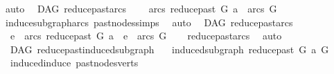\begin{isabellebody}
\ auto\isanewline
{}\isamarkupfalse%
%
\endisatagproof
{\isafoldproof}%
%
\isadelimproof
%
\endisadelimproof
%
\isadelimdocument
%
\endisadelimdocument
%
\isatagdocument
%
\isamarkuptrue%
%
\endisatagdocument
{\isafolddocument}%
%
\isadelimdocument
%
\endisadelimdocument
{}\isamarkupfalse%
\ {\isacharparenleft}{\kern0pt}\ DAG{\isacharparenright}{\kern0pt}\ reduce{\isacharunderscore}{\kern0pt}past{\isacharunderscore}{\kern0pt}arcs{\isacharcolon}{\kern0pt}\ \isanewline
\ \ \ {\isachardoublequoteopen}arcs\ {\isacharparenleft}{\kern0pt}reduce{\isacharunderscore}{\kern0pt}past\ G\ a{\isacharparenright}{\kern0pt}\ {\isasymsubseteq}\ arcs\ G{\isachardoublequoteclose}\isanewline
%
\isadelimproof
\ \ %
\endisadelimproof
%
\isatagproof
{}\isamarkupfalse%
\ induce{\isacharunderscore}{\kern0pt}subgraph{\isacharunderscore}{\kern0pt}arcs\ past{\isacharunderscore}{\kern0pt}nodes{\isachardot}{\kern0pt}simps\ \isamarkupfalse%
\ auto%
\endisatagproof
{\isafoldproof}%
%
\isadelimproof
\isanewline
%
\endisadelimproof
\isanewline
{}\isamarkupfalse%
\ {\isacharparenleft}{\kern0pt}\ DAG{\isacharparenright}{\kern0pt}\ reduce{\isacharunderscore}{\kern0pt}past{\isacharunderscore}{\kern0pt}arcs{}{\isacharcolon}{\kern0pt}\isanewline
\ \ {\isachardoublequoteopen}e\ {\isasymin}\ arcs\ {\isacharparenleft}{\kern0pt}reduce{\isacharunderscore}{\kern0pt}past\ G\ a{\isacharparenright}{\kern0pt}\ {\isasymLongrightarrow}\ e\ {\isasymin}\ arcs\ G{\isachardoublequoteclose}\isanewline
%
\isadelimproof
\ \ %
\endisadelimproof
%
\isatagproof
{}\isamarkupfalse%
\ reduce{\isacharunderscore}{\kern0pt}past{\isacharunderscore}{\kern0pt}arcs\ \isamarkupfalse%
\ auto%
\endisatagproof
{\isafoldproof}%
%
\isadelimproof
\isanewline
%
\endisadelimproof
\isanewline
{}\isamarkupfalse%
\ {\isacharparenleft}{\kern0pt}\ DAG{\isacharparenright}{\kern0pt}\ reduce{\isacharunderscore}{\kern0pt}past{\isacharunderscore}{\kern0pt}induced{\isacharunderscore}{\kern0pt}subgraph{\isacharcolon}{\kern0pt}\isanewline
\ \ \ {\isachardoublequoteopen}induced{\isacharunderscore}{\kern0pt}subgraph\ {\isacharparenleft}{\kern0pt}reduce{\isacharunderscore}{\kern0pt}past\ G\ a{\isacharparenright}{\kern0pt}\ G{\isachardoublequoteclose}\isanewline
%
\isadelimproof
\ \ %
\endisadelimproof
%
\isatagproof
{}\isamarkupfalse%
\ \ induced{\isacharunderscore}{\kern0pt}induce\ past{\isacharunderscore}{\kern0pt}nodes{\isacharunderscore}{\kern0pt}verts\ \isamarkupfalse%

\end{isabellebody}
